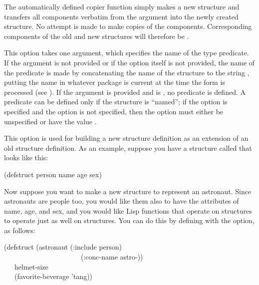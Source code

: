 \begin{flushdesc}
The automatically defined copier function simply makes a new structure
and transfers all components verbatim from the argument into the
newly created structure.  No attempt is made to make copies
of the components.  Corresponding components of the old and
new structures will therefore be .

\item[\cd{:predicate}]
This option takes one argument, which specifies the name of the type predicate.
If the argument is not provided or if the option itself is not
provided, the name of the predicate is made by concatenating the
name of the structure to the string , putting the name
in whatever package is current at the time the 
form is processed (see ).
If the argument is
provided and is {\false}, no predicate is defined.  A predicate can be defined
only if the structure is ``named'';
if the  option is specified
and the  option is
not specified, then the  option must either be unspecified
or have the value {\false}.

\item[\cd{:include}]
This option is used for building a new structure definition as
an extension of an old structure definition.  As an example,
suppose you have a structure called  that looks like this:
\begin{lisp}
(defstruct person name age sex)
\end{lisp}
Now suppose you want to make a new structure to represent an astronaut.
Since astronauts are people too, you would like them also to have the
attributes of name, age, and sex, and you would like Lisp functions
that operate on  structures to operate just as well on
 structures.  You can do this by defining 
with the  option, as follows:
\begin{lisp}
(defstruct (astronaut (:include person) \\
~~~~~~~~~~~~~~~~~~~~~~(:conc-name astro-)) \\
~~~helmet-size \\
~~~(favorite-beverage 'tang))
\end{lisp}


\end{flushdesc}
